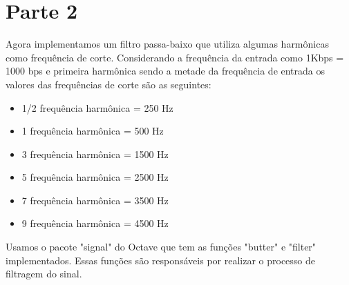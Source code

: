 \documentclass{article}
\begin{document}
    \section{Parte 2}
        Agora implementamos um filtro passa-baixo que utiliza algumas harmônicas como frequência de corte. Considerando a frequência da entrada como 1Kbps = 1000 bps e primeira harmônica sendo a metade da frequência de entrada os valores das frequências de corte são as seguintes:
        \begin{itemize}
            \item 1/2 frequência harmônica = 250 Hz
            \item 1 frequência harmônica = 500 Hz
            \item 3 frequência harmônica = 1500 Hz
            \item 5 frequência harmônica = 2500 Hz
            \item 7 frequência harmônica = 3500 Hz
            \item 9 frequência harmônica = 4500 Hz
        \end{itemize}
        Usamos o pacote "signal" do Octave que tem as funções "butter" e "filter" implementados. Essas funções são responsáveis por realizar o processo de filtragem do sinal. 
        
\end{document}
